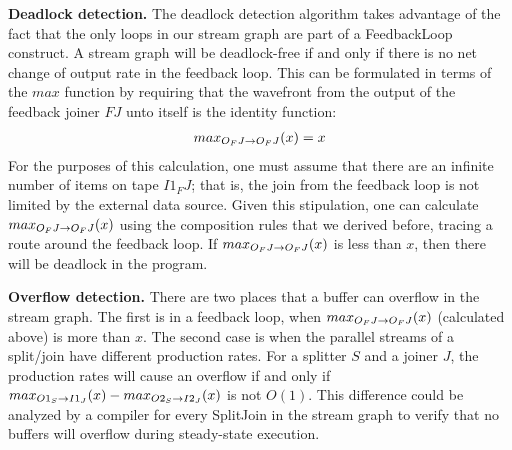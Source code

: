 {\bf Deadlock detection.}  The deadlock detection algorithm takes
advantage of the fact that the only loops in our stream graph are part
of a FeedbackLoop construct.  A stream graph will be deadlock-free if
and only if there is no net change of output rate in the feedback
loop.  This can be formulated in terms of the $max$ function by
requiring that the wavefront from the output of the feedback joiner
$FJ$ unto itself is the identity function:
\begin{eqnarray*}
max_{O_FJ \rightarrow O_FJ}(x) = x
\end{eqnarray*}
For the purposes of this calculation, one must assume that there are
an infinite number of items on tape $I1_FJ$; that is, the join from
the feedback loop is not limited by the external data source.  Given
this stipulation, one can calculate $max_{O_FJ \rightarrow O_FJ}(x)$ using the
composition rules that we derived before, tracing a route around the
feedback loop.  If $max_{O_FJ \rightarrow O_FJ}(x)$ is less than $x$, then there
will be deadlock in the program.

{\bf Overflow detection.}  There are two places that a buffer can
overflow in the stream graph.  The first is in a feedback loop, when
$max_{O_FJ \rightarrow O_FJ}(x)$ (calculated above) is more than $x$.  The second
case is when the parallel streams of a split/join have different
production rates.  For a splitter $S$ and a joiner $J$, the production
rates will cause an overflow if and only if $max_{O1_S \rightarrow I1_J}(x) -
max_{O2_S \rightarrow I2_J}(x)$ is not $O(1)$.  This difference could be analyzed
by a compiler for every SplitJoin in the stream graph to verify that
no buffers will overflow during steady-state execution.



